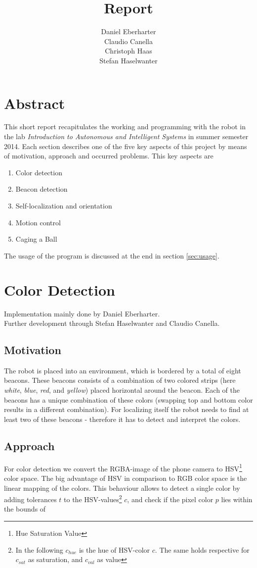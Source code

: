 \documentclass[703031]{iisreport}
\title{\textbf{Report}}
\author{Daniel Eberharter\\ Claudio Canella\\ Christoph Haas\\ Stefan Haselwanter}
\begin{document}
\maketitle

\section{Abstract}
This short report recapitulates the working and programming with the robot in the lab \emph{Introduction to Autonomous and Intelligent Systems} in summer semester 2014. Each section describes one of the five key aspects of this project by means of motivation, approach and occurred problems. This key aspects are
\begin{enumerate}
	\item Color detection
	\item Beacon detection
	\item Self-localization and orientation
	\item Motion control
	\item Caging a Ball\\
\end{enumerate}
The usage of the program is discussed at the end in section \ref{sec:usage}.

\section{Color Detection}
Implementation mainly done by Daniel Eberharter.\\
Further development through Stefan Haselwanter and Claudio Canella.

\subsection{Motivation}
The robot is placed into an environment, which is bordered by a total of eight beacons. These beacons consists of a combination of two colored strips (here \emph{white}, \emph{blue}, \emph{red}, and \emph{yellow}) placed horizontal around the beacon. Each of the beacons has a unique combination of these colors (swapping top and bottom color results in a different combination).
For localizing itself the robot needs to find at least two of these beacons - therefore it has to detect and interpret the colors.

\subsection{Approach}
For color detection we convert the RGBA-image of the phone camera to HSV\footnote{Hue Saturation Value} color space. The big advantage of HSV in comparison to RGB color space is the linear mapping of the colors. This behaviour allows to detect a single color by adding tolerances $t$ to the HSV-values\footnote{In the following $c_{hue}$ is the hue of HSV-color $c$. The same holds respective for $c_{sat}$ as saturation, and $c_{val}$ as value} $c$, and check if the pixel color $p$ lies within the bounds of 
\end{document}
